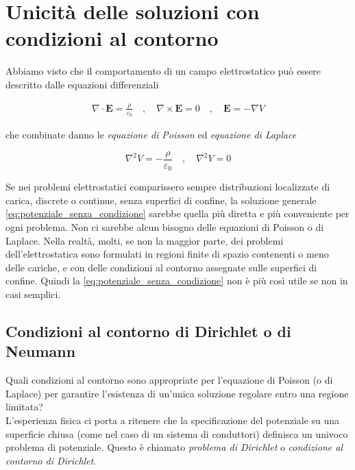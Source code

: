 \chapter{Unicità delle soluzioni con condizioni al contorno}

Abbiamo visto che il comportamento di un campo elettrostatico può essere descritto dalle equazioni differenziali 

\begin{align*}
    \nabla \cdot \mathbf{E} = \frac{\rho}{\varepsilon_0} \quad, \quad \nabla \times \mathbf{E} = 0 \quad , \quad \mathbf{E} = - \nabla V
\end{align*}

che combinate danno le \emph{equazione di Poisson} ed \emph{equazione di Laplace}

\begin{equation*}
    \nabla ^2 V = - \frac{\rho}{\varepsilon_0} \quad , \quad \nabla^2 V = 0
\end{equation*}

Se nei problemi elettrostatici comparissero sempre distribuzioni localizzate di carica, discrete o continue, senza superfici di confine, la soluzione generale \ref{eq:potenziale_senza_condizione} sarebbe quella più diretta e più conveniente per ogni problema. Non ci sarebbe alcun bisogno delle equazioni di Poisson o di Laplace. Nella realtà, molti, se non la maggior parte, dei problemi dell'elettrostatica sono formulati in regioni finite di spazio contenenti o meno delle cariche, e con delle condizioni al contorno assegnate sulle superfici di confine. Quindi la \ref{eq:potenziale_senza_condizione} non è più così utile se non in casi semplici. 

\section{Condizioni al contorno di Dirichlet o di Neumann}

Quali condizioni al contorno sono appropriate per l'equazione di Poisson (o di Laplace) per garantire l'esistenza di un'unica soluzione regolare entro una regione limitata?\\

L'esperienza fisica ci porta a  ritenere che la specificazione del potenziale su una superficie chiusa (come nel caso di un sistema di conduttori) definisca un univoco problema di potenziale. Questo è chiamato \emph{problema di Dirichlet} o \emph{condizione al contorno di Dirichlet}. \\

